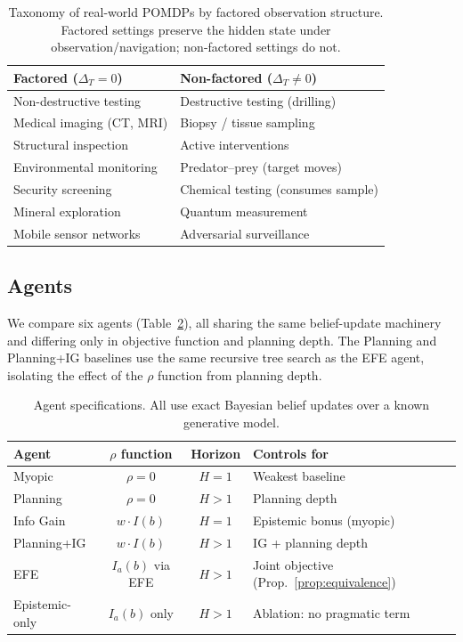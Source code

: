 \documentclass{article}
\begin{document}
\begin{table}[ht]
\centering
\caption{Taxonomy of real-world POMDPs by factored observation structure. Factored settings preserve the hidden state under observation/navigation; non-factored settings do not.}
\label{tab:taxonomy}
\begin{small}
\begin{tabular}{p{3.6cm}p{4.2cm}}
\toprule
\textbf{Factored} ($\Delta_T{=}0$) & \textbf{Non-factored} ($\Delta_T{\neq}0$) \\
\midrule
Non-destructive testing & Destructive testing (drilling) \\
Medical imaging (CT, MRI) & Biopsy / tissue sampling \\
Structural inspection & Active interventions \\
Environmental monitoring & Predator--prey (target moves) \\
Security screening & Chemical testing (consumes sample) \\
Mineral exploration & Quantum measurement \\
Mobile sensor networks & Adversarial surveillance \\
\bottomrule
\end{tabular}
\end{small}
\end{table}

\subsection{Agents}

We compare six agents (Table~\ref{tab:agents}), all sharing the same belief-update machinery and differing only in objective function and planning depth. The Planning and Planning+IG baselines use the same recursive tree search as the EFE agent, isolating the effect of the $\rho$ function from planning depth.

\begin{table}[ht]
\centering
\caption{Agent specifications. All use exact Bayesian belief updates over a known generative model.}
\label{tab:agents}
\begin{small}
\begin{tabular}{lccl}
\toprule
Agent & $\rho$ function & Horizon & Controls for \\
\midrule
Myopic & $\rho = 0$ & $H{=}1$ & Weakest baseline \\
Planning & $\rho = 0$ & $H > 1$ & Planning depth \\
Info Gain & $w \cdot I(b)$ & $H{=}1$ & Epistemic bonus (myopic) \\
Planning+IG & $w \cdot I(b)$ & $H > 1$ & IG + planning depth \\
EFE & $I_a(b)$ via EFE & $H > 1$ & Joint objective (Prop.~\ref{prop:equivalence}) \\
Epistemic-only & $I_a(b)$ only & $H > 1$ & Ablation: no pragmatic term \\
\bottomrule
\end{tabular}
\end{small}
\end{table}
\end{document}
